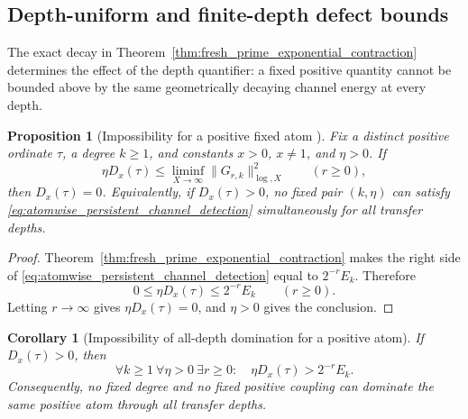 \documentclass[11pt]{amsart}
\numberwithin{equation}{section}
\theoremstyle{plain}
\newtheorem{proposition}[theorem]{Proposition}
\newtheorem{corollary}[theorem]{Corollary}
\theoremstyle{definition}
\theoremstyle{remark}
\begin{document}
\subsection{Depth-uniform and finite-depth defect bounds}
\label{subsec:depth_uniform_audit}

The exact decay in Theorem~\ref{thm:fresh_prime_exponential_contraction} determines the effect of the depth quantifier: a fixed positive quantity cannot be bounded above by the same geometrically decaying channel energy at every depth.

\begin{proposition}[Impossibility for a positive fixed atom {\normalfont[Unconditional]}]
\label{prop:positive_atom_uniform_domination_impossible}
Fix a distinct positive ordinate $\tau$, a degree $k\geq1$, and constants $x>0$, $x\neq1$, and $\eta>0$.  If
\begin{equation}
\eta D_x(\tau)
\leq
\liminf_{X\to\infty}
\|G_{r,k}\|_{\log,X}^2
\qquad(r\geq0),
\label{eq:atomwise_persistent_channel_detection}
\end{equation}
then $D_x(\tau)=0$.  Equivalently, if $D_x(\tau)>0$, no fixed pair $(k,\eta)$ can satisfy \eqref{eq:atomwise_persistent_channel_detection} simultaneously for all transfer depths.
\end{proposition}

\begin{proof}
Theorem~\ref{thm:fresh_prime_exponential_contraction} makes the right side of \eqref{eq:atomwise_persistent_channel_detection} equal to $2^{-r}E_k$.  Therefore
\begin{equation}
0\leq\eta D_x(\tau)\leq2^{-r}E_k
\qquad(r\geq0).
\label{eq:uniform_atom_squeeze}
\end{equation}
Letting $r\to\infty$ gives $\eta D_x(\tau)=0$, and $\eta>0$ gives the conclusion.
\end{proof}

\begin{corollary}[Impossibility of all-depth domination for a positive atom]
\label{cor:all_depth_condition_impossible}
If $D_x(\tau)>0$, then
\begin{equation}
\boxed{
\forall k\geq1\ \forall\eta>0\ \exists r\geq0:
\quad
\eta D_x(\tau)>2^{-r}E_k.}
\label{eq:explicit_all_depth_impossibility}
\end{equation}
Consequently, no fixed degree and no fixed positive coupling can dominate the same positive atom through all transfer depths.
\end{corollary}
\end{document}
